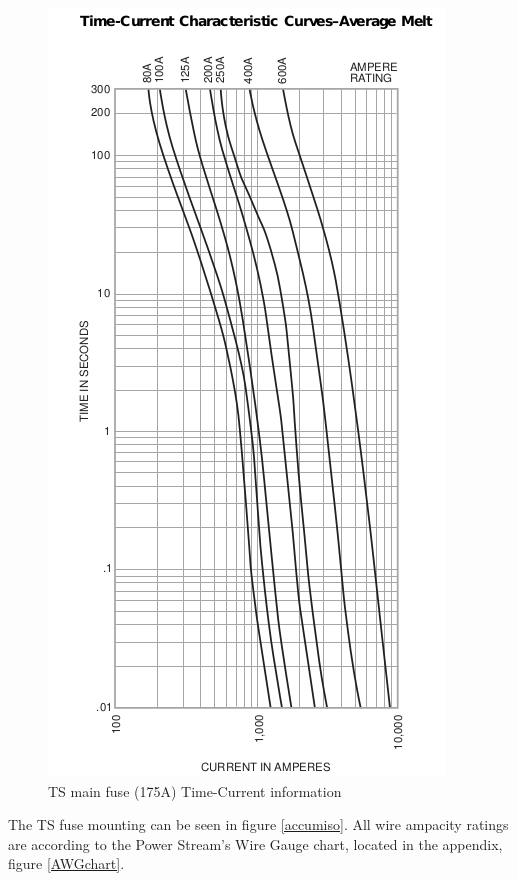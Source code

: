\documentclass{article}
\begin{document}
            \begin{figure}[H]
                \centering
                \includegraphics[width = 0.25 \textheight]{TSfuseT-Agraph}
                \caption{TS main fuse (175A) Time-Current information}
                \label{TSi2t}
            \end{figure}

            The TS fuse mounting can be seen in figure \ref{accumiso}.
            All wire ampacity ratings are according to the Power Stream's Wire Gauge chart, located in the appendix, figure \ref{AWGchart}.
\end{document}
